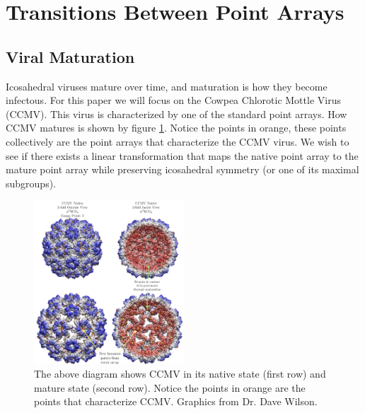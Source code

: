 \documentclass[a4paper,10pt]{article}
\theoremstyle{plain}
\theoremstyle{definition}
\theoremstyle{remark}
\begin{document}
\section{Transitions Between Point Arrays}
\subsection{Viral Maturation}
Icosahedral viruses mature over time, and maturation is how they become infectous.
For this paper we will focus on the Cowpea Chlorotic Mottle Virus (CCMV).
This virus is characterized by one of the standard point arrays.
How CCMV matures is shown by figure \ref{fig:CCMV_maturation}.
Notice the points in orange, these points collectively are the point arrays that characterize the CCMV virus.
We wish to see if there exists a linear transformation that maps the native point array to the mature point array while preserving icosahedral symmetry (or one of its maximal subgroups).

\begin{figure}[!h]
	\centering
	\captionsetup{width=0.5\textwidth}
	\includegraphics[width=0.5\textwidth]{images/CCMV_maturation.png}
	\caption{
		The above diagram shows CCMV in its native state (first row) and mature state (second row). 
		Notice the points in orange are the points that characterize CCMV.
		Graphics from Dr. Dave Wilson.
	}
	\label{fig:CCMV_maturation}
\end{figure}
\end{document}
